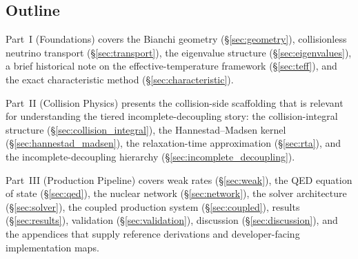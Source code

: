 \subsection{Outline}

Part~I (Foundations) covers the Bianchi geometry (\S\ref{sec:geometry}), collisionless neutrino transport (\S\ref{sec:transport}), the eigenvalue structure (\S\ref{sec:eigenvalues}), a brief historical note on the effective-temperature framework (\S\ref{sec:teff}), and the exact characteristic method (\S\ref{sec:characteristic}).

Part~II (Collision Physics) presents the collision-side scaffolding that is relevant for understanding the tiered incomplete-decoupling story: the collision-integral structure (\S\ref{sec:collision_integral}), the Hannestad--Madsen kernel (\S\ref{sec:hannestad_madsen}), the relaxation-time approximation (\S\ref{sec:rta}), and the incomplete-decoupling hierarchy (\S\ref{sec:incomplete_decoupling}).

Part~III (Production Pipeline) covers weak rates (\S\ref{sec:weak}), the QED equation of state (\S\ref{sec:qed}), the nuclear network (\S\ref{sec:network}), the solver architecture (\S\ref{sec:solver}), the coupled production system (\S\ref{sec:coupled}), results (\S\ref{sec:results}), validation (\S\ref{sec:validation}), discussion (\S\ref{sec:discussion}), and the appendices that supply reference derivations and developer-facing implementation maps.

